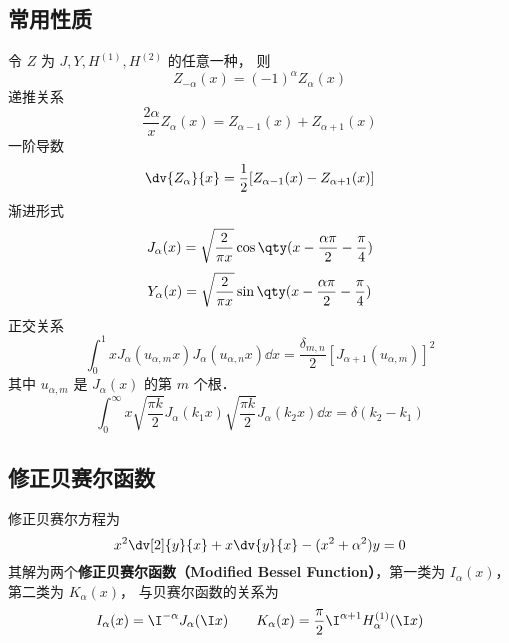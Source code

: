 \subsection{常用性质}
令 $Z$ 为 $J, Y, H^{(1)}, H^{(2)}$ 的任意一种， 则
\begin{equation}
Z_{-\alpha}(x) = (-1)^\alpha Z_\alpha(x)
\end{equation}
递推关系
\begin{equation}
\frac{2\alpha}{x} Z_\alpha(x) = Z_{\alpha -1}(x) + Z_{\alpha+1}(x)
\end{equation}
一阶导数
\begin{equation}
\dv{Z_\alpha}{x} = \frac12 [Z_{\alpha  - 1}(x) - Z_{\alpha +1}(x)]
\end{equation}
渐进形式
\begin{equation}
J_\alpha(x) = \sqrt{\frac{2}{\pi x}} \cos\qty(x - \frac{\alpha\pi}{2} - \frac{\pi}{4})
\end{equation}
\begin{equation}
Y_\alpha(x) = \sqrt{\frac{2}{\pi x}} \sin\qty(x - \frac{\alpha\pi}{2} - \frac{\pi}{4})
\end{equation}
正交关系
\begin{equation}
\int_0^1 x J_\alpha (u_{\alpha ,m} x) J_\alpha (u_{\alpha ,n} x) \dd{x} = \frac{\delta_{m,n}}{2}[J_{\alpha + 1} (u_{\alpha ,m})]^2
\end{equation}
其中 $u_{\alpha, m}$ 是 $J_\alpha(x)$ 的第 $m$ 个根．
\begin{equation}
\int_0^\infty x \sqrt{\frac{\pi k}{2}} J_\alpha (k_1 x) \sqrt{\frac{\pi k}{2}}J_\alpha (k_2 x) \dd{x} = \delta(k_2 - k_1)
\end{equation}

\subsection{修正贝赛尔函数}
修正贝赛尔方程为
\begin{equation}
x^2 \dv[2]{y}{x} + x \dv{y}{x} - (x^2 + \alpha ^2)y = 0
\end{equation}
其解为两个\textbf{修正贝赛尔函数（Modified Bessel Function）}，第一类为 $I_\alpha(x)$，  第二类为 $K_\alpha(x)$，  与贝赛尔函数的关系为
\begin{equation}
I_\alpha(x) = \I^{-\alpha} J_\alpha(\I x)
\qquad
K_\alpha(x) = \frac{\pi}{2} \I^{\alpha  + 1} H_\alpha ^{(1)}(\I x)
\end{equation}

